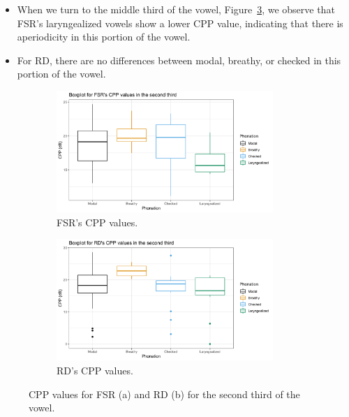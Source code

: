 \documentclass[12pt, letterpaper]{article}
\begin{document}
\begin{itemize}
	\item When we turn to the middle third of the vowel, Figure~\ref{fig:cppsecond}, we observe that FSR's laryngealized vowels show a lower CPP value, indicating that there is aperiodicity in this portion of the vowel. 
	\item For RD, there are no differences between modal, breathy, or checked in this portion of the vowel. 
\end{itemize}
\begin{figure}[!h]
	\centering
	\begin{subfigure}{.5\textwidth}
		\centering
		\includegraphics[width=0.9\textwidth]{../mean_FSR_cpp_Second.png}
		\caption{FSR's CPP values.}
		\label{fig:FSRcppsecond} 
	\end{subfigure}%
	\begin{subfigure}{.5\textwidth}
		\centering
		\includegraphics[width=0.9\textwidth]{../mean_RD_cpp_Second.png}
		\caption{RD's CPP values.}
		\label{fig:RDcppsecond} 
	\end{subfigure}
	\caption{CPP values for FSR (a) and RD (b) for the second third of the vowel. }
	\label{fig:cppsecond}
\end{figure}
\end{document}
